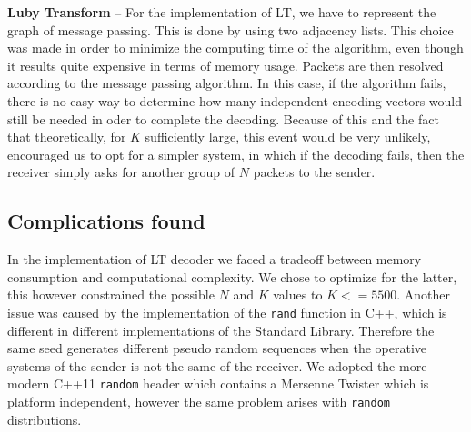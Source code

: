 \textbf{Luby Transform} -- For the implementation of LT, we have to represent the graph of message passing. This is done by using two adjacency lists. This choice was made in order to minimize the computing time of the algorithm, even though it results quite expensive in terms of memory usage. Packets are then resolved according to the message passing algorithm. In this case, if the algorithm fails, there is no easy way to determine how many independent encoding vectors would still be needed in oder to complete the decoding. Because of this and the fact that theoretically, for $K$ sufficiently large, this event would be very unlikely, encouraged us to opt for a simpler system, in which if the decoding fails, then the receiver simply asks for another group of $N$ packets to the sender. 

\subsection{Complications found}
In the implementation of LT decoder we faced a tradeoff between memory consumption and computational complexity. We chose to optimize for the latter, this however constrained the possible $N$ and $K$ values to $K <= 5500$. Another issue was caused by the implementation of the \texttt{rand} function in C++, which is different in different implementations of the Standard Library. Therefore the same seed generates different pseudo random sequences when the operative systems of the sender is not the same of the receiver. We adopted the more modern C++11 \texttt{random} header which contains a Mersenne Twister which is platform independent, however the same problem arises with \texttt{random} distributions.


